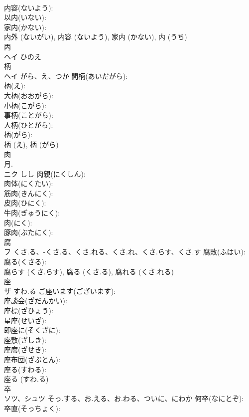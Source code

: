 \documentclass[8pt]{extreport}
\begin{document}
\begin{CJK}{UTF8}{min}
\\	内容(ないよう): 
\\	以内(いない): 
\\	家内(かない): 
\\	内外 (ないがい), 内容 (ないよう), 家内 (かない), 内 (うち)
\\	丙			
\\	ヘイ	ひのえ		
\\	柄			
\\	ヘイ	がら、え、つか	間柄(あいだがら): 
\\	柄(え): 
\\	大柄(おおがら): 
\\	小柄(こがら): 
\\	事柄(ことがら): 
\\	人柄(ひとがら): 
\\	柄(がら): 
\\	柄 (え), 柄 (がら)
\\	肉			
\\	月.
\\	ニク	しし	肉親(にくしん): 
\\	肉体(にくたい): 
\\	筋肉(きんにく): 
\\	皮肉(ひにく): 
\\	牛肉(ぎゅうにく): 
\\	肉(にく): 
\\	豚肉(ぶたにく): 
\\	腐			
\\	フ	くさ.る、-くさ.る、くさ.れる、くさ.れ、くさ.らす、くさ.す	腐敗(ふはい): 
\\	腐る(くさる): 
\\	腐らす (くさ.らす), 腐る (くさ.る), 腐れる (くさ.れる)
\\	座			
\\	ザ	すわ.る	ご座います(ございます): 
\\	座談会(ざだんかい): 
\\	座標(ざひょう): 
\\	星座(せいざ): 
\\	即座に(そくざに): 
\\	座敷(ざしき): 
\\	座席(ざせき): 
\\	座布団(ざぶとん): 
\\	座る(すわる): 
\\	座る (すわ.る)
\\	卒			
\\	ソツ、シュツ	そっ.する、お.える、お.わる、ついに、にわか	何卒(なにとぞ): 
\\	卒直(そっちょく): 

\end{CJK}
\end{document}
